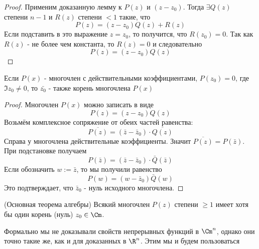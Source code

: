 \begin{proof}
	Применим доказанную лемму к $P(z)$ и $(z - z_0)$. Тогда $\exists Q(z)$ степени $n - 1$ и $R(z)$ степени $< 1$ такие, что
	\[
		P(z) = (z - z_0)Q(z) + R(z)
	\]
	Если подставить в это выражение $z = z_0$, то получится, что $R(z_0) = 0$. Так как $R(z)$ - не более чем константа, то $R(z) = 0$ и следовательно
	\[
		P(z) = (z - z_0)Q(z)
	\]
\end{proof}

\begin{lemma}
	Если $P(x)$ - многочлен с действительными коэффициентами, $P(z_0) = 0$, где $\Im z_0 \neq 0$, то $\bar{z_0}$ - также корень многочлена $P(x)$
\end{lemma}

\begin{proof}
	Многочлен $P(x)$ можно записать в виде
	\[
		P(z) = (z - z_0)Q(z)
	\]
	Возьмём комплексное сопряжение от обеих частей равенства:
	\[
		\overline{P(z)} = (\bar{z} - \bar{z}_0) \cdot \overline{Q(z)}
	\]
	Справа у многочлена действительные коэффициенты. Значит $\overline{P(z)} = P(\bar{z})$. При подстановке получаем
	\[
		P(\bar{z}) = (\bar{z} - \bar{z}_0) \cdot \bar{Q}(\bar{z})
	\]
	Если обозначить $w := \bar{z}$, то мы получили равенство
	\[
		P(w) = (w - \bar{z}_0)\bar{Q}(w)
	\]
	Это подтверждает, что $\bar{z}_0$ - нуль исходного многочлена.
\end{proof}

\begin{theorem} (Основная теорема алгебры)
	Всякий многочлен $P(z)$ степени $\ge 1$ имеет хотя бы один корень (нуль) $z_0 \in \Cm$.
\end{theorem}

\begin{note}
	Формально мы не доказывали свойств непрерывных функций в $\Cm^n$, однако они точно такие же, как и для доказанных в $\R^n$. Этим мы и будем пользоваться
\end{note}

